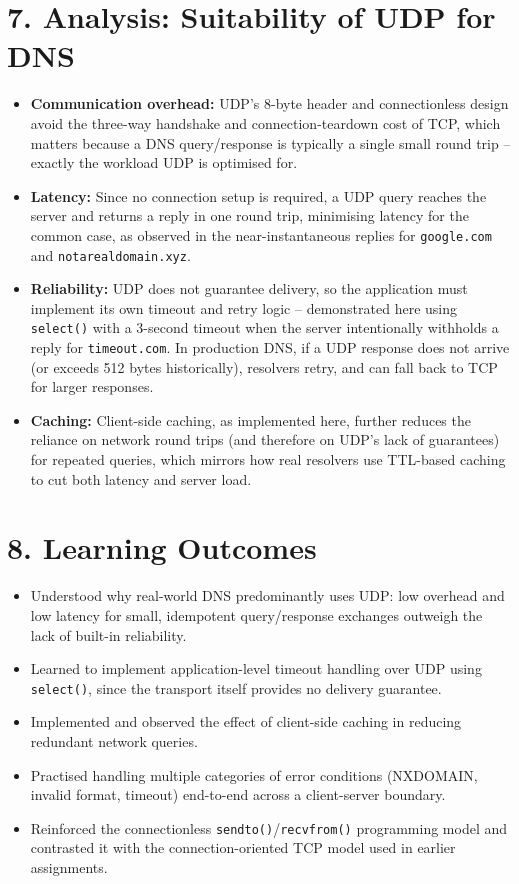 \documentclass[11pt]{article}
\begin{document}
\section*{7. Analysis: Suitability of UDP for DNS}
\begin{itemize}
  \item \textbf{Communication overhead:} UDP's 8-byte header and connectionless design avoid the
        three-way handshake and connection-teardown cost of TCP, which matters because a DNS
        query/response is typically a single small round trip -- exactly the workload UDP is
        optimised for.
  \item \textbf{Latency:} Since no connection setup is required, a UDP query reaches the server
        and returns a reply in one round trip, minimising latency for the common case, as observed
        in the near-instantaneous replies for \texttt{google.com} and \texttt{notarealdomain.xyz}.
  \item \textbf{Reliability:} UDP does not guarantee delivery, so the application must implement
        its own timeout and retry logic -- demonstrated here using \texttt{select()} with a
        3-second timeout when the server intentionally withholds a reply for \texttt{timeout.com}.
        In production DNS, if a UDP response does not arrive (or exceeds 512 bytes historically),
        resolvers retry, and can fall back to TCP for larger responses.
  \item \textbf{Caching:} Client-side caching, as implemented here, further reduces the
        reliance on network round trips (and therefore on UDP's lack of guarantees) for repeated
        queries, which mirrors how real resolvers use TTL-based caching to cut both latency and
        server load.
\end{itemize}

\section*{8. Learning Outcomes}
\begin{itemize}
  \item Understood why real-world DNS predominantly uses UDP: low overhead and low latency for
        small, idempotent query/response exchanges outweigh the lack of built-in reliability.
  \item Learned to implement application-level timeout handling over UDP using \texttt{select()},
        since the transport itself provides no delivery guarantee.
  \item Implemented and observed the effect of client-side caching in reducing redundant network
        queries.
  \item Practised handling multiple categories of error conditions (NXDOMAIN, invalid format,
        timeout) end-to-end across a client-server boundary.
  \item Reinforced the connectionless \texttt{sendto()}/\texttt{recvfrom()} programming model and
        contrasted it with the connection-oriented TCP model used in earlier assignments.
\end{itemize}
\end{document}
